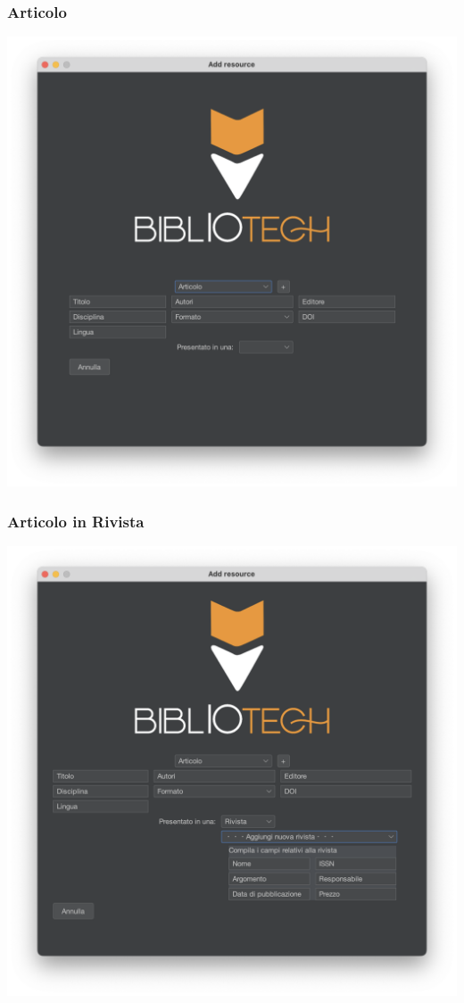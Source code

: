  \subsubsection{Articolo}
 \includegraphics[scale=0.25, center]{Immagini/Schermate/Insert/InserisciRisorsaPage-Articolo.png}
 \subsubsection{Articolo in Rivista}
 \includegraphics[scale=0.25, center]{Immagini/Schermate/Insert/InserisciRisorsaPage-ArticoloRivista.png}

